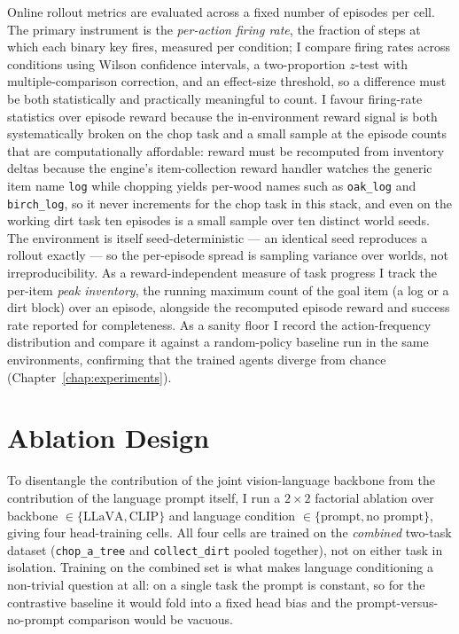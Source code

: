 Online rollout metrics are evaluated across a fixed number of episodes per
cell. The primary instrument is the \emph{per-action firing rate}, the
fraction of steps at which each binary key fires, measured per condition; I
compare firing rates across conditions using Wilson confidence intervals, a
two-proportion $z$-test with multiple-comparison correction, and an
effect-size threshold, so a difference must be both statistically and
practically meaningful to count. I favour firing-rate statistics over episode
reward because the in-environment reward signal is both systematically broken on
the chop task and a small sample at the episode counts that are computationally
affordable: reward must be recomputed from inventory deltas because the engine's
item-collection reward handler watches the generic item name \texttt{log} while
chopping yields per-wood names such as \texttt{oak\_log} and \texttt{birch\_log},
so it never increments for the chop task in this stack, and even on the working
dirt task ten episodes is a small sample over ten distinct world seeds. The
environment is itself seed-deterministic --- an identical seed reproduces a
rollout exactly --- so the per-episode spread is sampling variance over worlds,
not irreproducibility. As a reward-independent measure of task progress I track the per-item
\emph{peak inventory}, the running maximum count of the goal item (a log or a
dirt block) over an episode, alongside the recomputed episode reward and
success rate reported for completeness. As a sanity floor I record the
action-frequency distribution and compare it against a random-policy baseline
run in the same environments, confirming that the trained agents diverge from
chance (Chapter~\ref{chap:experiments}).

\section{Ablation Design} \label{ablation}

To disentangle the contribution of the joint vision-language backbone from
the contribution of the language prompt itself, I run a $2 \times 2$
factorial ablation over backbone $\in \{\text{LLaVA}, \text{CLIP}\}$ and
language condition $\in \{\text{prompt}, \text{no prompt}\}$, giving four
head-training cells. All four cells are trained on the \emph{combined}
two-task dataset (\texttt{chop\_a\_tree} and \texttt{collect\_dirt} pooled
together), not on either task in isolation. Training on the combined set is
what makes language conditioning a non-trivial question at all: on a single
task the prompt is constant, so for the contrastive baseline it would fold
into a fixed head bias and the prompt-versus-no-prompt comparison would be
vacuous.


